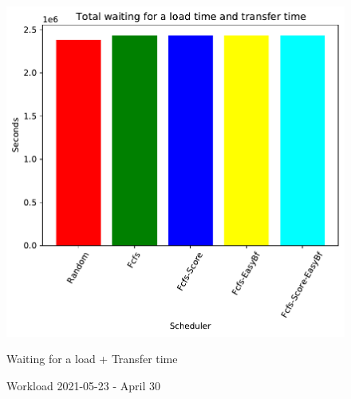 \documentclass[a4paper]{article}
\begin{document}
\begin{figure}[H]
  \begin{minipage}[b]{0.5\linewidth}
    \centering
    \includegraphics[width=1.11\linewidth]{MBSS/plot/2021-05-23_Total_waiting_for_a_load_time_and_transfer_time.pdf} 
    \caption{Waiting for a load + Transfer time} 
    \vspace{4ex}
  \end{minipage}%
  \caption{Workload 2021-05-23 - April 30}
\end{figure}
\end{document}
